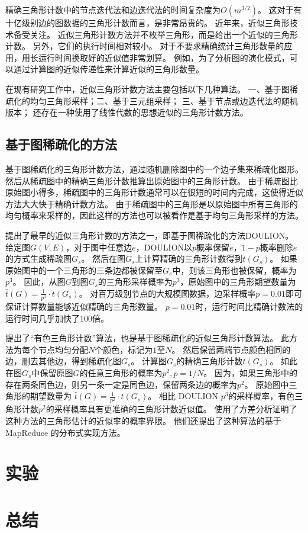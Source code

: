 精确三角形计数中的节点迭代法和边迭代法的时间复杂度为$O(m^{3/2})$。
这对于有十亿级别边的图数据的三角形计数而言，是非常昂贵的。
近年来，近似三角形技术备受关注。
近似三角形计数方法并不枚举三角形，而是给出一个近似的三角形计数。
另外，它们的执行时间相对较小。
对于不要求精确统计三角形数量的应用，用长运行时间换取好的近似值非常划算。
例如，为了分析图的演化模式，可以通过计算图的近似传递性来计算近似的三角形数量。

在现有研究工作中，近似三角形计数方法主要包括以下几种算法。
一、基于图稀疏化的均匀三角形采样；二、基于三元组采样；
三、基于节点或边迭代法的随机版本；
还存在一种使用了线性代数的思想近似的三角形计数方法。

\section{基于图稀疏化的方法}

基于图稀疏化的三角形计数方法，通过随机删除图中的一个边子集来稀疏化图形。
然后从稀疏图中的精确三角形计数推算出原始图中的三角形计数。
由于稀疏图比原始图小得多，稀疏图中的三角形计数通常可以在很短的时间内完成，这使得近似方法大大快于精确计数方法。
由于稀疏图中的三角形是以原始图中所有三角形的均匀概率来采样的，因此这样的方法也可以被看作是基于均匀三角形采样的方法。

\cite{tsourakakis2009doulion}提出了最早的近似三角形计数的方法之一，即基于图稀疏化的方法DOULION。
给定图$G(V,E)$，对于图中任意边$e$，DOULION以$p$概率保留$e$，$1-p$概率删除$e$的方式生成稀疏图$G_s$。
然后在图$G_s$上计算精确的三角形计数得到$t(G_s)$。
如果原始图中的一个三角形的三条边都被保留至$G_s$中，则该三角形也被保留，概率为$p^3$。
因此，从图$G$到图$G_s$的三角形采样概率为$p^3$，原始图中的三角形期望数量为
$\hat{t}(G)=\frac{1}{p^3}\cdot t(G_s) $。
对百万级别节点的大规模图数据，边采样概率$p=0.01$即可保证计算数量能够近似精确的三角形数量。
$p=0.01$时，运行时间比精确计数法的运行时间几乎加快了100倍。

\cite{pagh2012colorful}提出了``有色三角形计数''算法，也是基于图稀疏化的近似三角形计数算法。
此方法为每个节点均匀分配$N$个颜色，标记为$1$至$N$。
然后保留两端节点颜色相同的边，删去其他边，得到稀疏化图$G_s$。
计算图$G_s$的精确三角形计数$t(G_s)$。
如此在图$G_s$中保留原图$G$的任意三角形的概率为$p^2,p=1/N$。
因为，如果三角形中的存在两条同色边，则另一条一定是同色边，保留两条边的概率为$p^2$。
原始图中三角形的期望数量为
$\hat{t}(G)=\frac{1}{p^2}\cdot t(G_s) $。
相比 DOULION $p^3$的采样概率，有色三角形计数$p^2$的采样概率具有更准确的三角形计数近似值。
\cite{pagh2012colorful}使用了方差分析证明了这种方法的三角形估计的近似率的概率界限。
他们还提出了这种算法的基于 MapReduce 的分布式实现方法。


\chapter{实验}

\chapter{总结}

